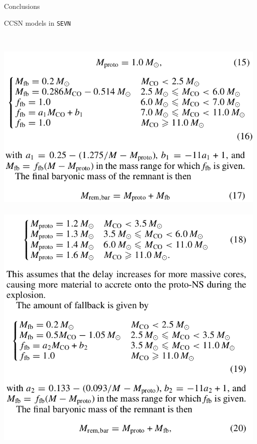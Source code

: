 \documentclass{beamer} %
\begin{document}
\begin{frame}{Conclusions}
\end{frame}




\begin{frame}[noframenumbering]
	\centering
	\Large
\end{frame}








\begin{frame}[noframenumbering]{CCSN models in \texttt{SEVN}}
	\small
	\begin{columns}
		\begin{column}{0.4\textwidth}
		\\
		\includegraphics[width=\textwidth]{./images/rapid.png}\\
		\\
		\includegraphics[width=\textwidth]{./images/delayed.png}\\

\end{column}
\end{columns}
\end{frame}
\end{document}
